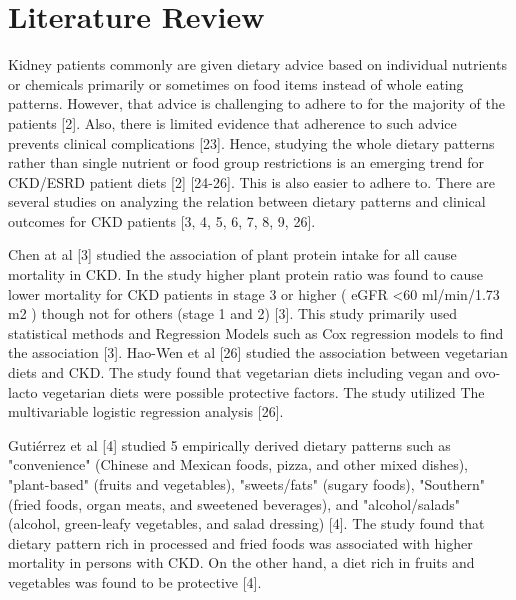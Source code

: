 \section{Literature Review}

\medskip
Kidney patients commonly are given dietary advice based on individual nutrients or chemicals primarily or sometimes on food items instead of whole eating patterns. However, that advice is challenging to adhere to for the majority of the patients [2].
Also, there is limited evidence that adherence to such advice prevents clinical complications [23]. Hence, studying the whole dietary patterns rather than single nutrient or food group restrictions is an emerging trend for CKD/ESRD patient diets [2] [24-26]. This is also easier to adhere to. There are several studies on analyzing the relation between dietary patterns and clinical outcomes for CKD patients [3, 4, 5, 6, 7, 8, 9, 26].

\medskip
\noindent Chen at al [3] studied the association of plant protein intake for all cause mortality in CKD. In the study higher plant protein ratio was found to cause lower mortality for CKD patients in stage 3 or higher ( eGFR  \textless 60 ml/min/1.73 m2 ) though not for others (stage 1 and 2) [3]. This study primarily used statistical methods and Regression Models such as Cox regression models to find the association [3]. Hao-Wen et al [26] studied the association between vegetarian diets and CKD. The study found that vegetarian diets including vegan and ovo-lacto vegetarian diets were possible protective factors. The study utilized The multivariable logistic regression analysis [26].

\medskip
\noindent Gutiérrez et al [4] studied 5 empirically derived dietary patterns such as "convenience" (Chinese and Mexican foods, pizza, and other mixed dishes), "plant-based" (fruits and vegetables), "sweets/fats" (sugary foods), "Southern" (fried foods, organ meats, and sweetened beverages), and "alcohol/salads" (alcohol, green-leafy vegetables, and salad dressing) [4]. The study found that dietary pattern rich in processed and fried foods was associated with higher mortality in persons with CKD. On the other hand, a diet rich in fruits and
vegetables was found to be protective [4].

